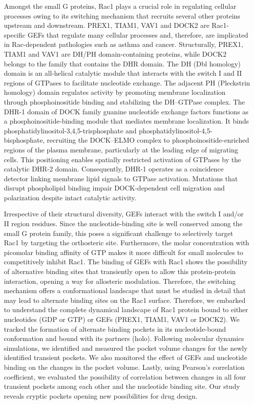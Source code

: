 \documentclass[12pt,a4paper]{achemso}
\begin{document}
Amongst the small G proteins, Rac1 plays a crucial role in regulating cellular processes owing to its switching mechanism that recruits several other proteins upstream and downstream. PREX1, TIAM1, VAV1 and DOCK2 are Rac1-specific GEFs that regulate many cellular processes and, therefore, are implicated in Rac-dependent pathologies such as asthma and cancer.  Structurally, PREX1, TIAM1 and VAV1 are DH/PH domain-containing proteins, while DOCK2 belongs to the family that contains the DHR domain. The DH (Dbl homology) domain is an all-helical catalytic module that interacts with the switch I and II regions of GTPases to facilitate nucleotide exchange. The adjacent PH (Pleckstrin homology) domain regulates activity by promoting membrane localization through phosphoinositide binding and stabilizing the DH–GTPase complex\cite{prex1pdb,tiam1pdb,vav1pdb}.  The DHR-1 domain of DOCK family guanine nucleotide exchange factors\cite{dock2pdb} functions as a phosphoinositide-binding module that mediates membrane localization. It binds phosphatidylinositol-3,4,5-trisphosphate and phosphatidylinositol-4,5-bisphosphate, recruiting the DOCK–ELMO complex to phosphoinositide-enriched regions of the plasma membrane, particularly at the leading edge of migrating cells. This positioning enables spatially restricted activation of GTPases by the catalytic DHR-2 domain. Consequently, DHR-1 operates as a coincidence detector linking membrane lipid signals to GTPase activation. Mutations that disrupt phospholipid binding impair DOCK-dependent cell migration and polarization despite intact catalytic activity.

Irrespective of their structural diversity, GEFs interact with the switch I and/or II region residues.  Since the nucleotide-binding site is well conserved among the small G protein family, this poses a significant challenge to selectively target Rac1 by targeting the orthosteric site. Furthermore, the molar concentration with picomolar binding affinity of GTP makes it more difficult for small molecules to competitively inhibit Rac1. The binding of GEFs with Rac1 shows the possibility of alternative binding sites that transiently open to allow this protein-protein interaction, opening a way for allosteric modulation. Therefore, the switching mechanism offers a conformational landscape that must be studied in detail that may lead to alternate binding sites on the Rac1 surface. Therefore, we embarked to understand the complete dynamical landscape of Rac1 protein bound to either nucleotides (GDP or GTP) or GEFs (PREX1, TIAM1, VAV1 or DOCK2).  We tracked the formation of alternate binding pockets in its nucleotide-bound conformation and bound with its partners (holo). Following molecular dynamics simulations, we identified and measured the pocket volume changes for the newly identified transient pockets. We also monitored the effect of GEFs and nucleotide binding on the changes in the pocket volume. Lastly, using Pearson's correlation coefficient, we evaluated the possibility of correlation between changes in all four transient pockets among each other and the nucleotide binding site. Our study reveals cryptic pockets opening new possibilities for drug design.
\end{document}
